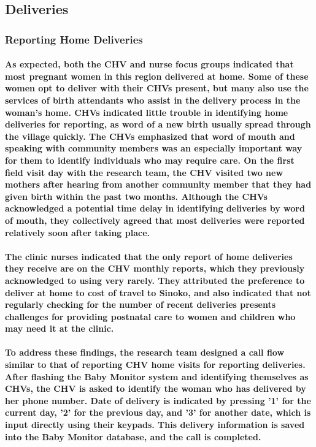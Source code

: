 \subsection{Deliveries}

\subsubsection{Reporting Home Deliveries}
\paragraph{As expected, both the CHV and nurse focus groups indicated that most pregnant women in this region delivered at home. Some of these women opt to deliver with their CHVs present, but many also use the services of birth attendants who assist in the delivery process in the woman's home. CHVs indicated little trouble in identifying home deliveries for reporting, as word of a new birth usually spread through the village quickly. The CHVs emphasized that word of mouth and speaking with community members was an especially important way for them to identify individuals who may require care. On the first field visit day with the research team, the CHV visited two new mothers after hearing from another community member that they had given birth within the past two months. Although the CHVs acknowledged a potential time delay in identifying deliveries by word of mouth, they collectively agreed that most deliveries were reported relatively soon after taking place.} 

\paragraph{The clinic nurses indicated that the only report of home deliveries they receive are on the CHV monthly reports, which they previously acknowledged to using very rarely. They attributed the preference to deliver at home to cost of travel to Sinoko, and also indicated that not regularly checking for the number of recent deliveries presents challenges for providing postnatal care to women and children who may need it at the clinic.}

\paragraph{To address these findings, the research team designed a call flow similar to that of reporting CHV home visits for reporting deliveries. After flashing the Baby Monitor system and identifying themselves as CHVs, the CHV is asked to identify the woman who has delivered by her phone number. Date of delivery is indicated by pressing '1' for the current day, '2' for the previous day, and '3' for another date, which is input directly using their keypads. This delivery information is saved into the Baby Monitor database, and the call is completed.}

